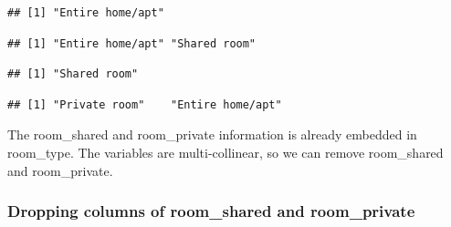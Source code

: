 \documentclass[
]{article}
\newenvironment{Shaded}{\begin{snugshade}}{\end{snugshade}}
\newcommand{\FunctionTok}[1]{\textcolor[rgb]{0.00,0.00,0.00}{#1}}
\newcommand{\NormalTok}[1]{#1}
\newcommand{\SpecialCharTok}[1]{\textcolor[rgb]{0.00,0.00,0.00}{#1}}
\newcommand{\StringTok}[1]{\textcolor[rgb]{0.31,0.60,0.02}{#1}}
\begin{document}
\begin{verbatim}
## [1] "Entire home/apt"
\end{verbatim}

\begin{Shaded}
\end{Shaded}

\begin{verbatim}
## [1] "Entire home/apt" "Shared room"
\end{verbatim}

\begin{Shaded}
\end{Shaded}

\begin{verbatim}
## [1] "Shared room"
\end{verbatim}

\begin{Shaded}
\end{Shaded}

\begin{verbatim}
## [1] "Private room"    "Entire home/apt"
\end{verbatim}

The room\_shared and room\_private information is already embedded in
room\_type. The variables are multi-collinear, so we can remove
room\_shared and room\_private.

\hypertarget{dropping-columns-of-room_shared-and-room_private}{%
\subsubsection{Dropping columns of room\_shared and
room\_private}\label{dropping-columns-of-room_shared-and-room_private}}
\end{document}
